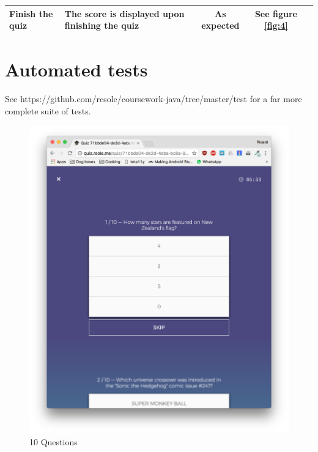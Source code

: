 \documentclass[english,a4paper,]{report}
\begin{document}
\begin{longtable}[]{@{}llccc@{}}
\begin{minipage}[t]{0.15\columnwidth}
Finish the quiz\strut
\end{minipage} & \begin{minipage}[t]{0.19\columnwidth}\centering\strut
The score is displayed upon finishing the quiz\strut
\end{minipage} & \begin{minipage}[t]{0.17\columnwidth}\centering\strut
As expected\strut
\end{minipage} & \begin{minipage}[t]{0.18\columnwidth}\centering\strut
See figure \ref{fig:4}\strut
\end{minipage}\tabularnewline
\bottomrule
\end{longtable}

\section{Automated tests}\label{automated-tests}

See https://github.com/rcsole/coursework-java/tree/master/test for a far
more complete suite of tests.

\begin{figure}
\centering
\includegraphics{report/images/00.png}
\caption{10 Questions\label{fig:1}}
\end{figure}
\end{document}

